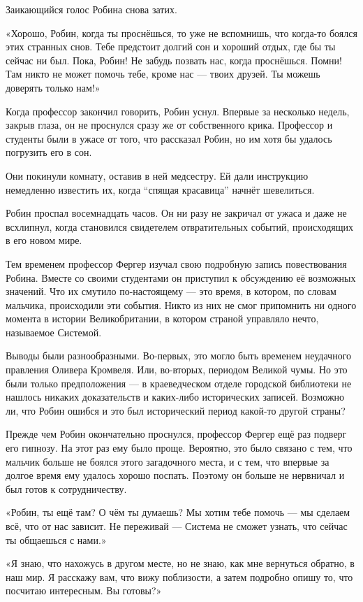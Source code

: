 \documentclass[a5paper, 9pt,
final, openany, twoside=true]{memoir}
\begin{document}
Заикающийся голос Робина снова затих.

«Хорошо, Робин, когда ты проснёшься, то уже не вспомнишь, что когда-то боялся этих странных снов. Тебе предстоит долгий сон и хороший отдых, где бы ты сейчас ни был. Пока, Робин! Не забудь позвать нас, когда проснёшься. Помни! Там никто не может помочь тебе, кроме нас — твоих друзей. Ты можешь доверять только нам!»

Когда профессор закончил говорить, Робин уснул. Впервые за несколько недель, закрыв глаза, он не проснулся сразу же от собственного крика. Профессор и студенты были в ужасе от того, что рассказал Робин, но им хотя бы удалось погрузить его в сон.

Они покинули комнату, оставив в ней медсестру. Ей дали инструкцию немедленно известить их, когда ``спящая красавица'' начнёт шевелиться.

Робин проспал восемнадцать часов. Он ни разу не закричал от ужаса и даже не всхлипнул, когда становился свидетелем отвратительных событий, происходящих в его новом мире.\bigskip

Тем временем профессор Фергер изучал свою подробную запись повествования Робина. Вместе со своими студентами он приступил к обсуждению её возможных значений. Что их смутило по-настоящему — это время, в котором, по словам мальчика, происходили эти события. Никто из них не смог припомнить ни одного момента в истории Великобритании, в котором страной управляло нечто, называемое Системой.

Выводы были разнообразными. Во-первых, это могло быть временем неудачного правления Оливера Кромвеля. Или, во-вторых, периодом Великой чумы. Но это были только предположения — в краеведческом отделе городской библиотеки не нашлось никаких доказательств и каких-либо исторических записей. Возможно ли, что Робин ошибся и это был исторический период какой-то другой страны?\bigskip

Прежде чем Робин окончательно проснулся, профессор Фергер ещё раз подверг его гипнозу. На этот раз ему было проще. Вероятно, это было связано с тем, что мальчик больше не боялся этого загадочного места, и с тем, что впервые за долгое время ему удалось хорошо поспать. Поэтому он больше не нервничал и был готов к сотрудничеству.

«Робин, ты ещё там? О чём ты думаешь? Мы хотим тебе помочь — мы сделаем всё, что от нас зависит. Не переживай — Система не сможет узнать, что сейчас ты общаешься с нами.»

«Я знаю, что нахожусь в другом месте, но не знаю, как мне вернуться обратно, в наш мир. Я расскажу вам, что вижу поблизости, а затем подробно опишу то, что посчитаю интересным. Вы готовы?»
\end{document}
